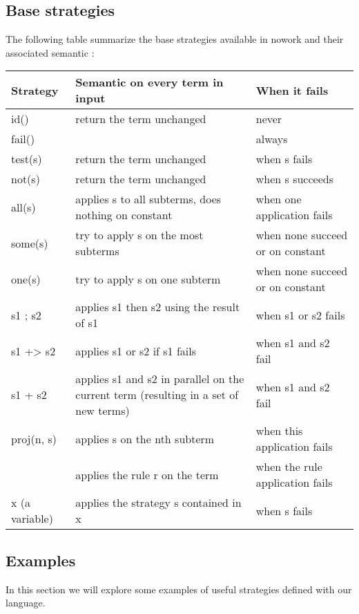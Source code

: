\documentclass[12pt,a4paper]{article}
\begin{document}
\subsection{Base strategies}
The following table summarize the base strategies available in nowork and their
associated semantic :\\

\begin{center}
    \begin{tabular}{ | l | p{6cm} | p{4cm} |}
    \hline
    Strategy & Semantic on every term in input & When it fails \\ \hline
    id() & return the term unchanged & never \\ \hline
    fail() & & always \\ \hline
    test(s) & return the term unchanged & when s fails \\ \hline
    not(s) & return the term unchanged & when s succeeds \\ \hline
    all(s) & applies s to all subterms, does nothing on constant & when one 
    application fails \\ \hline
    some(s) & try to apply s on the most subterms & when none succeed or on constant 
    \\ \hline
    one(s) & try to apply s on one subterm & when none succeed or on constant 
    \\ \hline
    s1 ; s2 & applies s1 then s2 using the result of s1 & when s1 or s2 fails 
    \\ \hline
    s1 +> s2 & applies s1 or s2 if s1 fails & when s1 and s2 fail \\ \hline
    s1 + s2 & applies s1 and s2 in parallel on the current term 
      (resulting in a set of new terms) & when s1 and s2 fail \\ \hline 
    proj(n, s) & applies s on the nth subterm &
      when this application fails \\ \hline
    [r] & applies the rule r on the term & when the rule application fails \\ \hline
    x (a variable) & applies the strategy s contained in x & when s fails \\ \hline
    \end{tabular}
\end{center}
\subsection{Examples}
In this section we will explore some examples of useful strategies defined with our
language.
\end{document}
